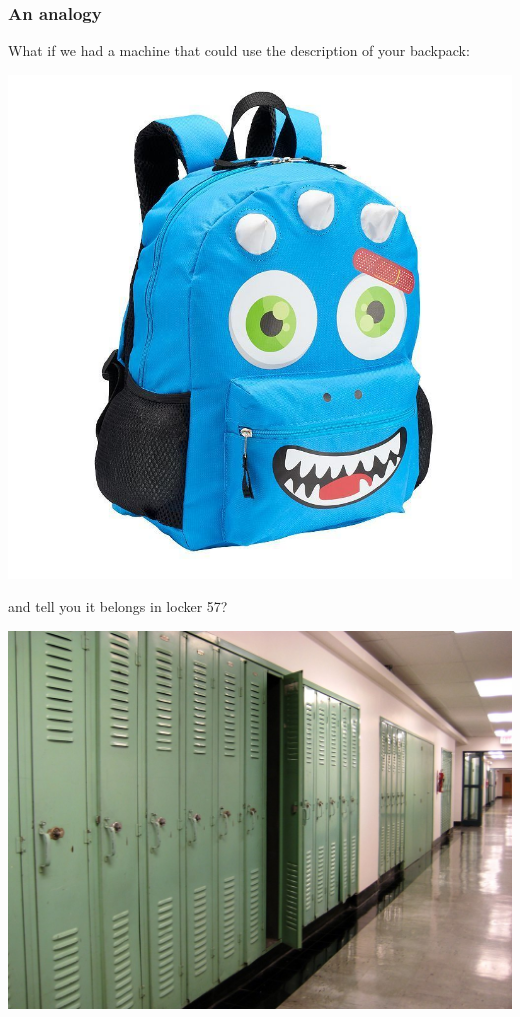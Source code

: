 \documentclass[aspectratio=169]{beamer}
\begin{document}
\begin{frame}
    \frametitle{An analogy}
    What if we had a machine that could use the description of your backpack:

    \begin{center}
        \includegraphics[height=0.3\textheight]{backpack.jpg}
    \end{center}

    and tell you it belongs in locker 57?

    \begin{center}
        \includegraphics[width=0.3\textheight]{lockers.jpg}
    \end{center}
\end{frame}
\end{document}
